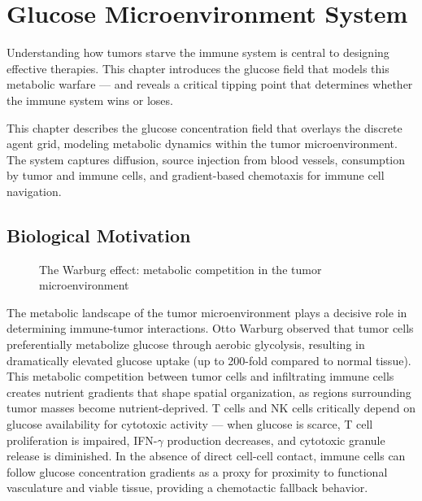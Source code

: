 \chapter{Glucose Microenvironment System}
\label{ch:glucose}

Understanding how tumors starve the immune system is central to designing effective therapies. This chapter introduces the glucose field that models this metabolic warfare --- and reveals a critical tipping point that determines whether the immune system wins or loses.

This chapter describes the glucose concentration field that overlays the discrete agent grid, modeling metabolic dynamics within the tumor microenvironment. The system captures diffusion, source injection from blood vessels, consumption by tumor and immune cells, and gradient-based chemotaxis for immune cell navigation.

\section{Biological Motivation}
\label{sec:glucose-bio}

\begin{figure}[htbp]
\centering
{}
\caption{The Warburg effect: metabolic competition in the tumor microenvironment}
\label{fig:warburg_effect}
\end{figure}

The metabolic landscape of the tumor microenvironment plays a decisive role in determining immune-tumor interactions. Otto Warburg observed that tumor cells preferentially metabolize glucose through aerobic glycolysis, resulting in dramatically elevated glucose uptake (up to 200-fold compared to normal tissue). This metabolic competition between tumor cells and infiltrating immune cells creates nutrient gradients that shape spatial organization, as regions surrounding tumor masses become nutrient-deprived. T cells and NK cells critically depend on glucose availability for cytotoxic activity — when glucose is scarce, T cell proliferation is impaired, IFN-$\gamma$ production decreases, and cytotoxic granule release is diminished. In the absence of direct cell-cell contact, immune cells can follow glucose concentration gradients as a proxy for proximity to functional vasculature and viable tissue, providing a chemotactic fallback behavior.

